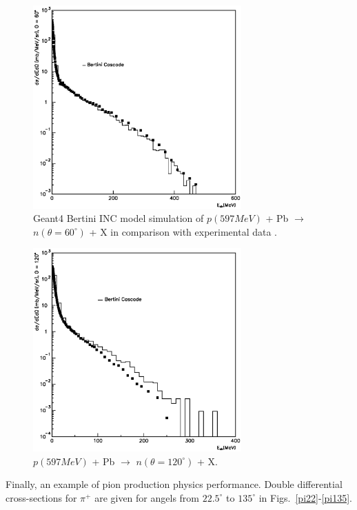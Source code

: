 \documentclass[twocolumn,twoside,slac,floatfix]{revtex4}
\begin{document}
\begin{figure}
  \includegraphics[width=80mm,keepaspectratio]{pn_pb_597_n_a1.eps}
  \caption{Geant4 Bertini INC model simulation of 
$p(597 MeV)$ + Pb $\rightarrow$ $n(\theta = 60^{\circ})$ + X 
in comparison with experimental data \cite{597lead}.}
  \label{pbn60}
\end{figure}


\begin{figure}
  \includegraphics[width=80mm,keepaspectratio]{pn_pb_597_n_a3.eps}
  \caption{$p(597 MeV)$ + Pb $\rightarrow$ $n(\theta = 120^{\circ})$ + X.}
  \label{pbn120}
\end{figure}




Finally, an example of pion production physics performance.
Double differential cross-sections for $\pi^{+}$ are given for
angels from $22.5^{\circ}$ to $135^{\circ}$ in Figs.~\ref{pi22}-\ref{pi135}.
\end{document}

